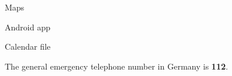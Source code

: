 \vspace*{\contentspace}%
\noindent Maps \dotfill \pageref{public-transport-map}

\vfill
\noindent\begin{minipage}[t]{0.47\linewidth}
  \begin{center}
    Android app

  \end{center}
\end{minipage}
\hfill
\begin{minipage}[t]{0.47\linewidth}
  \begin{center}
    Calendar file

  \end{center}
\end{minipage}

\noindent
The general emergency telephone number in Germany is \textbf{112}.

\newpage
